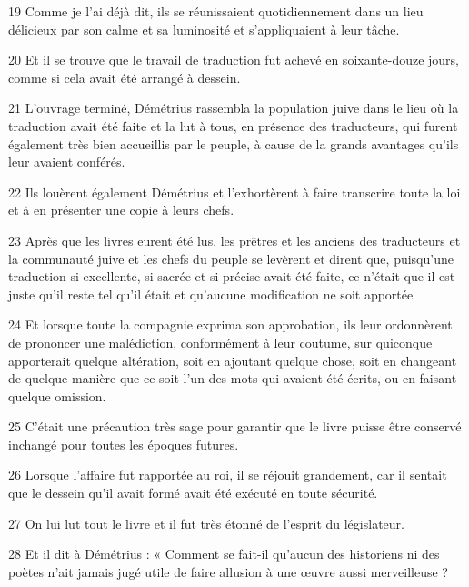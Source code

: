 \par 19 Comme je l'ai déjà dit, ils se réunissaient quotidiennement dans un lieu délicieux par son calme et sa luminosité et s'appliquaient à leur tâche.

\par 20 Et il se trouve que le travail de traduction fut achevé en soixante-douze jours, comme si cela avait été arrangé à dessein.

\par 21 L'ouvrage terminé, Démétrius rassembla la population juive dans le lieu où la traduction avait été faite et la lut à tous, en présence des traducteurs, qui furent également très bien accueillis par le peuple, à cause de la grands avantages qu'ils leur avaient conférés.

\par 22 Ils louèrent également Démétrius et l'exhortèrent à faire transcrire toute la loi et à en présenter une copie à leurs chefs.

\par 23 Après que les livres eurent été lus, les prêtres et les anciens des traducteurs et la communauté juive et les chefs du peuple se levèrent et dirent que, puisqu'une traduction si excellente, si sacrée et si précise avait été faite, ce n'était que il est juste qu'il reste tel qu'il était et qu'aucune modification ne soit apportée

\par 24 Et lorsque toute la compagnie exprima son approbation, ils leur ordonnèrent de prononcer une malédiction, conformément à leur coutume, sur quiconque apporterait quelque altération, soit en ajoutant quelque chose, soit en changeant de quelque manière que ce soit l'un des mots qui avaient été écrits, ou en faisant quelque omission.

\par 25 C'était une précaution très sage pour garantir que le livre puisse être conservé inchangé pour toutes les époques futures.

\par 26 Lorsque l'affaire fut rapportée au roi, il se réjouit grandement, car il sentait que le dessein qu'il avait formé avait été exécuté en toute sécurité.

\par 27 On lui lut tout le livre et il fut très étonné de l'esprit du législateur.

\par 28 Et il dit à Démétrius : « Comment se fait-il qu'aucun des historiens ni des poètes n'ait jamais jugé utile de faire allusion à une œuvre aussi merveilleuse ?

